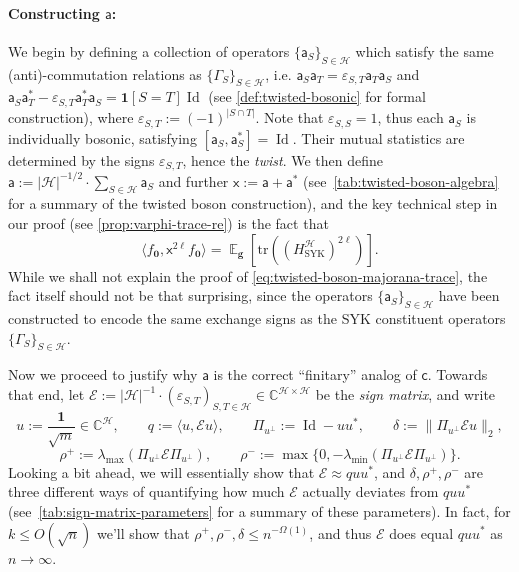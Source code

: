 \documentclass
[11pt,letterpaper]
{article}
\theoremstyle{definition}
\newcommand{\sfc}{\mathsf c}
\newcommand{\sfa}{\mathsf a}
\newcommand{\sfx}{\mathsf x}
\newcommand{\eps}{\varepsilon}
\newcommand{\cE}{{\mathcal E}}
\newcommand{\1}{\mathbf{1}}
\newcommand{\tr}{\mathrm{tr}}
\newcommand{\C}{\mathbb C}
\newcommand{\cH}{\mathcal H}
\newcommand{\Id}{\operatorname{Id}}
\DeclareMathOperator*{\E}{\mathbb{E}}
\renewcommand{\leq}{\leqslant}
\begin{document}
\paragraph{Constructing $\sfa$:} 
We begin by defining a collection of operators $\{\sfa_S\}_{S\in\cH}$ which satisfy the same (anti)-commutation relations as $\{\Gamma_S\}_{S\in\cH}$, i.e. $\sfa_S\sfa_T = \eps_{S, T}\sfa_T\sfa_S$ and $\sfa_S\sfa_T^* - \eps_{S, T}\sfa_T^*\sfa_S=\1[S=T]\Id$ (see \cref{def:twisted-bosonic} for formal construction), where $\eps_{S, T}:= (-1)^{|S\cap T|}$. Note that $\eps_{S,S}=1$, thus each $\sfa_S$ is individually bosonic, satisfying $[\sfa_S,\sfa_S^*] = \Id$. Their mutual statistics are determined by the signs $\eps_{S, T}$, hence the \emph{twist}. We then define $\sfa:= |\cH|^{-1/2}\cdot\sum_{S\in\cH}\sfa_S$ and further $\sfx:= \sfa + \sfa^*$ (see~\cref{tab:twisted-boson-algebra} for a summary of the twisted boson construction), and the key technical step in our proof (see \cref{prop:varphi-trace-re}) is the fact that 
\begin{equation}\label{eq:twisted-boson-majorana-trace}
    \langle f_{\bm 0}, \sfx^{2\ell} f_{\bm 0}\rangle = \E_{\bm g}\left[\tr\left(\left(H^\cH_{\operatorname{SYK}}\right)^{2\ell}\right)\right].
\end{equation}
While we shall not explain the proof of \cref{eq:twisted-boson-majorana-trace}, the fact itself should not be that surprising, since the operators $\{\sfa_S\}_{S\in\cH}$ have been constructed to encode the same exchange signs as the SYK constituent operators $\{\Gamma_S\}_{S\in\cH}$.

Now we proceed to justify why $\sfa$ is the correct ``finitary'' analog of $\sfc$. Towards that end, let $\cE:= |\cH|^{-1}\cdot(\eps_{S, T})_{S, T\in\cH}\in\C^{\cH\times\cH}$ be the \emph{sign matrix}, and write 
\[u:= \frac{\1}{\sqrt{m}}\in\C^\cH,\qquad q:= \langle u, \cE u\rangle,\qquad \Pi_{u^\perp}:= \Id - uu^*,\qquad \delta:= \|\Pi_{u^\perp}\cE u\|_2,\] 
\[\rho^+:= \lambda_{\max}(\Pi_{u^\perp}\cE\Pi_{u^\perp}),\qquad \rho^-:= \max\{0, -\lambda_{\min}(\Pi_{u^\perp}\cE\Pi_{u^\perp})\}.\]
Looking a bit ahead, we will essentially show that $\cE\approx quu^*$, and $\delta, \rho^+, \rho^-$ are three different ways of quantifying how much $\cE$ actually deviates from $quu^*$ (see~\cref{tab:sign-matrix-parameters} for a summary of these parameters). In fact, for $k\leq O(\sqrt{n})$ we'll show that $\rho^+, \rho^-, \delta\leq n^{-\Omega(1)}$, and thus $\cE$ does equal $quu^*$ as $n\to\infty$.
\end{document}
